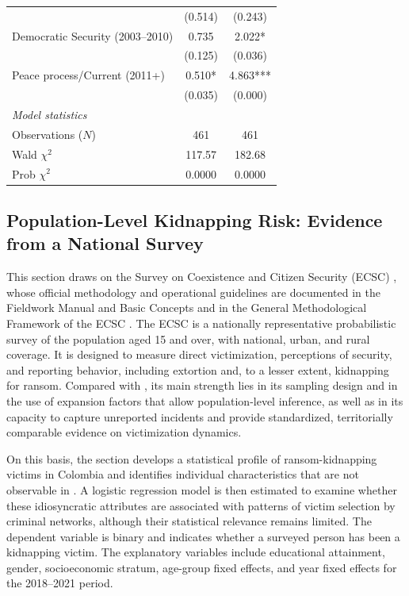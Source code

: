 \documentclass[12pt,a4paper]{article}
\providecommand{\textcite}{\citet}
\theoremstyle{plain}
\theoremstyle{definition}
\theoremstyle{remark}
\newcommand{\1}{\mathbf{1}}
\begin{document}
{\begin{longtable}{p{}cc}
                               & {\scriptsize (0.514)} & {\scriptsize (0.243)} \\
    Democratic Security (2003--2010) & 0.735 & 2.022* \\
                                    & {\scriptsize (0.125)} & {\scriptsize (0.036)} \\
    Peace process/Current (2011+) & 0.510* & 4.863*** \\
                                  & {\scriptsize (0.035)} & {\scriptsize (0.000)} \\
    \midrule
    \multicolumn{3}{l}{\textit{Model statistics}} \\
    Observations ($N$) & 461 & 461 \\
    Wald $\chi^2$ & 117.57 & 182.68 \\
    Prob $\chi^2$ & 0.0000 & 0.0000 \\
\end{longtable}
}

\subsection{Population-Level Kidnapping Risk: Evidence from a National Survey}
\label{subsec:encuesta-nacional}

This section draws on the Survey on Coexistence and Citizen Security (ECSC) \textcite{DANE_ECSC_2021}, whose official methodology and operational guidelines are documented in the Fieldwork Manual and Basic Concepts \textcite{dane2022manual} and in the General Methodological Framework of the ECSC \textcite{dane2022ecsc}. The ECSC is a nationally representative probabilistic survey of the population aged 15 and over, with national, urban, and rural coverage. It is designed to measure direct victimization, perceptions of security, and reporting behavior, including extortion and, to a lesser extent, kidnapping for ransom. Compared with \textcite{cnmh_datos}, its main strength lies in its sampling design and in the use of expansion factors that allow population-level inference, as well as in its capacity to capture unreported incidents and provide standardized, territorially comparable evidence on victimization dynamics.

On this basis, the section develops a statistical profile of ransom-kidnapping victims in Colombia and identifies individual characteristics that are not observable in \textcite{cnmh_datos}. A logistic regression model is then estimated to examine whether these idiosyncratic attributes are associated with patterns of victim selection by criminal networks, although their statistical relevance remains limited. The dependent variable is binary and indicates whether a surveyed person has been a kidnapping victim. The explanatory variables include educational attainment, gender, socioeconomic stratum, age-group fixed effects, and year fixed effects for the 2018--2021 period.
\end{document}
